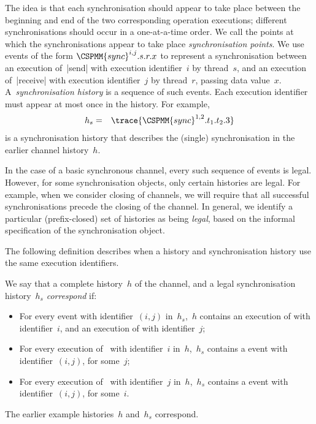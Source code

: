 The idea is that each synchronisation should appear to take place between the
beginning and end of the two corresponding operation executions; different
synchronisations should occur in a one-at-a-time order.  We call the points at
which the synchronisations appear to take place \emph{synchronisation points}.
%
We use events of the form $\CSPMM{sync}^{i,j}.s.r.x$ to represent a
synchronisation between an execution of~|send| with execution identifier~$i$ by
thread~$s$, and an execution of~|receive| with execution identifier~$j$ by
thread~$r$, passing data value~$x$.
%
A~\emph{synchronisation history} is a sequence of such  events.
Each execution identifier must appear at most once in the history. 
For example,
\begin{eqnarray*}
h_s & = & \trace{\CSPMM{sync}^{1,2}.t_1.t_2.3}
\end{eqnarray*}
is a synchronisation history that describes the (single) synchronisation in
the earlier channel history~$h$.

In the case of a basic synchronous channel, every such sequence of 
events is legal.  However, for some synchronisation objects, only certain
histories are legal.  For example, when we consider closing of channels, we
will require that all successful synchronisations precede the closing of the
channel.  In general, we identify a particular (prefix-closed) set of
histories as being \emph{legal}, based on the informal specification of the
synchronisation object.

The following definition describes when a history and synchronisation history
use the same execution identifiers.
\begin{definition}
We say that a complete history~$h$ of the channel, and a legal synchronisation
history~$h_s$ \emph{correspond} if:
%
\begin{itemize}
\item For every  event with identifier~$(i,j)$ in~$h_s$,\, $h$
  contains an execution of  with identifier~$i$, and an execution
  of  with identifier~$j$;

\item For every execution of~ with identifier~$i$ in~$h$,\, $h_s$
  contains a  event with identifier~$(i,j)$, for some~$j$;

\item For every execution of~ with identifier~$j$ in~$h$,\,
  $h_s$ contains a  event with identifier~$(i,j)$, for some~$i$.
\end{itemize}
\end{definition}
%
The earlier example histories~$h$ and~$h_s$ correspond.

